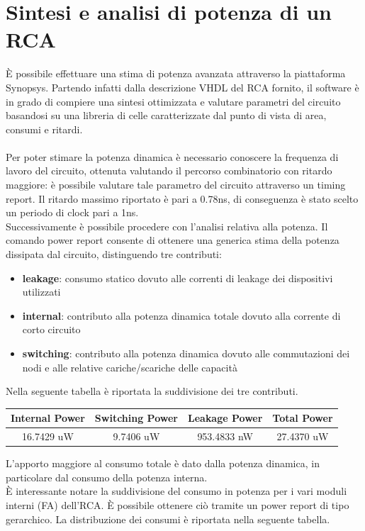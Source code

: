 \documentclass[11pt,  english, makeidx, a4paper, titlepage, oneside]{book}
\begin{document}
\section{Sintesi e analisi di potenza di un RCA}
È possibile effettuare una stima di potenza avanzata attraverso la piattaforma Synopsys. 
Partendo infatti dalla descrizione VHDL del RCA fornito, il software è in grado di compiere una sintesi ottimizzata e valutare parametri del circuito basandosi su una libreria di celle caratterizzate dal punto di vista di area, consumi e ritardi.
\\\\
Per poter stimare la potenza dinamica è necessario conoscere la frequenza di lavoro del circuito, ottenuta valutando il percorso combinatorio con ritardo maggiore: è possibile valutare tale parametro del circuito attraverso un timing report.
Il ritardo massimo riportato è pari a 0.78ns, di conseguenza è stato scelto un periodo di clock pari a 1ns.\\
Successivamente è possibile procedere con l'analisi relativa alla potenza.
Il comando power report consente di ottenere una generica stima della potenza dissipata dal circuito, distinguendo tre contributi:
\begin{itemize}
\item \textbf{leakage}: consumo statico dovuto alle correnti di leakage dei dispositivi utilizzati
\item \textbf{internal}: contributo alla potenza dinamica totale dovuto alla corrente di corto circuito
\item \textbf{switching}: contributo alla potenza dinamica dovuto alle commutazioni dei nodi e alle relative cariche/scariche delle capacità
\end{itemize}
Nella seguente tabella è riportata la suddivisione dei tre contributi.
\\
\begin{center}
	\begin{tabular}{|c|c|c|c|}
	\hline
	Internal Power & Switching Power & Leakage Power & Total Power \\ 
	\hline
	16.7429 uW & 9.7406 uW & 953.4833 nW & 27.4370 uW \\
	\hline
	\end{tabular}
\end{center}
\vspace{0.3cm}
L'apporto maggiore al consumo totale è dato dalla potenza dinamica, in particolare dal consumo della potenza interna.\\
È interessante notare la suddivisione del consumo in potenza per i vari moduli interni (FA) dell'RCA. È possibile ottenere ciò tramite un power report di tipo gerarchico. La distribuzione dei consumi è riportata nella seguente tabella.
\end{document}
